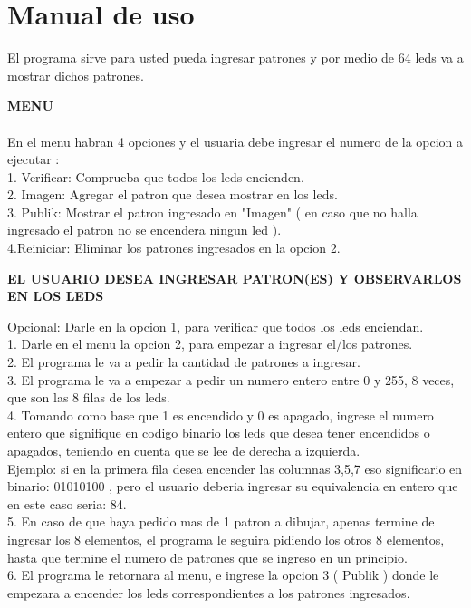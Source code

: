 \documentclass{article}
\begin{document}
\vspace{13cm}

\section{Manual de uso} \label{Manual de uso}

El programa sirve para usted pueda ingresar patrones y por medio de 64 leds va a mostrar dichos patrones.

\vspace{1cm}

\textbf{MENU} \\
\\
En el menu habran 4 opciones y el usuaria debe ingresar el numero de la opcion a ejecutar :\\
1. Verificar: Comprueba que todos los leds encienden. \\
2. Imagen: Agregar el patron que desea mostrar en los leds.\\
3. Publik: Mostrar el patron ingresado en "Imagen" ( en caso que no halla ingresado el patron no se encendera ningun led ).\\
4.Reiniciar: Eliminar los patrones ingresados en la opcion 2.

\vspace{1cm}

\textbf{EL USUARIO DESEA INGRESAR PATRON(ES) Y OBSERVARLOS EN LOS LEDS} 

\vspace{1cm}

Opcional: Darle en la opcion 1, para verificar que todos los leds enciendan.\\

1. Darle en el menu la opcion 2, para empezar a ingresar el/los patrones.\\
2. El programa le va a pedir la cantidad de patrones a ingresar.\\
3. El programa le va a empezar a pedir un numero entero entre 0 y 255, 8 veces, que son las 8 filas de los leds.\\
4. Tomando como base que 1 es encendido y 0 es apagado, ingrese el numero entero que signifique en codigo binario los leds que desea tener encendidos o apagados, teniendo en cuenta que se lee de derecha a izquierda. \\
Ejemplo: si en la primera fila desea encender las columnas 3,5,7 eso significario en binario: 01010100 , pero el usuario deberia ingresar su equivalencia en entero que en este caso seria: 84.\\

5. En caso de que haya pedido mas de 1 patron a dibujar, apenas termine de ingresar los 8 elementos, el programa le seguira pidiendo los otros 8 elementos, hasta que termine el numero de patrones que se ingreso en un principio.\\

6. El programa le retornara al menu, e ingrese la opcion 3 ( Publik ) donde le empezara a encender los leds correspondientes a los patrones ingresados.\\
\end{document}
